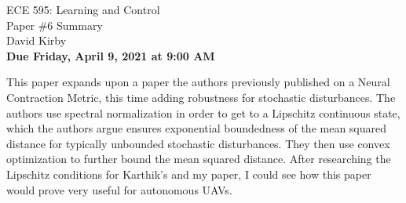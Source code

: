 \documentclass[11pt]{article}
\begin{document}
\begin{center}
\LARGE{ECE 595: Learning and Control\\Paper \#6 Summary}\\[1.5em]
\large David Kirby\\[1.5em]
\large \textbf{Due Friday, April 9, 2021 at 9:00 AM}\\[2.5em]
\end{center}

\noindent This paper expands upon a paper the authors previously published on a Neural Contraction Metric, this time adding robustness for stochastic disturbances. The authors use spectral normalization in order to get to a Lipschitz continuous state, which the authors argue ensures exponential boundedness of the mean squared distance for typically unbounded stochastic disturbances. They then use convex optimization to further bound the mean squared distance. After researching the Lipschitz conditions for Karthik's and my paper, I could see how this paper would prove very useful for autonomous UAVs.
\end{document}
